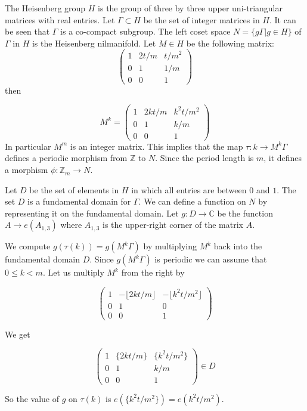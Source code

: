 \documentclass [11pt] {article}
\begin{document}
The Heisenberg group $H$ is the group of three by three upper uni-triangular matrices with real entries.
Let $\Gamma\subset H$ be the set of integer matrices in $H$. It can be seen that $\Gamma$ is a co-compact subgroup. The left coset space $N=\{g\Gamma|g\in H\}$ of $\Gamma$ in $H$ is the Heisenberg nilmanifold.
Let $M\in H$ be the following matrix:
\[ \left( \begin{array}{ccc}
1 & 2t/m & t/m^2\\
0 & 1 & 1/m \\
0 & 0 & 1 \end{array} \right)\]
then

\[M^k= \left( \begin{array}{ccc}
1 & 2kt/m & k^2t/m^2\\
0 & 1 & k/m \\
0 & 0 & 1 \end{array} \right)\]
In particular $M^m$ is an integer matrix.
This implies that the map $\tau:k\rightarrow M^k\Gamma$ defines a periodic morphism from $\mathbb{Z}$ to $N$.
Since the period length is $m$, it defines a morphism $\phi:\mathbb{Z}_m\rightarrow N$.

Let $D$ be the set of elements in $H$ in which all entries are between $0$ and $1$. The set $D$ is a fundamental domain for $\Gamma$. We can define a function on $N$ by representing it on the fundamental domain.
Let $g:D\rightarrow\mathbb{C}$ be the function $A\rightarrow e(A_{1,3})$ where $A_{1,3}$ is the upper-right corner of the matrix $A$. 

We compute $g(\tau(k))=g(M^k\Gamma)$ by multiplying $M^k$ back into the fundamental domain $D$.
Since $g(M^k\Gamma)$ is periodic we can assume that $0\leq k<m$.
Let us multiply $M^k$ from the right by

\[ \left( \begin{array}{ccc}
1 & -\lfloor 2kt/m\rfloor & -\lfloor k^2t/m^2\rfloor\\
0 & 1 & 0\\
0 & 0 & 1 \end{array} \right)\]

We get 

\[ \left( \begin{array}{ccc}
1 & \{ 2kt/m\} & \{k^2t/m^2\}\\
0 & 1 & k/m\\
0 & 0 & 1 \end{array} \right)\in D\]

So the value of $g$ on $\tau(k)$ is $e(\{k^2t/m^2\})=e(k^2t/m^2)$.
\end{document}
